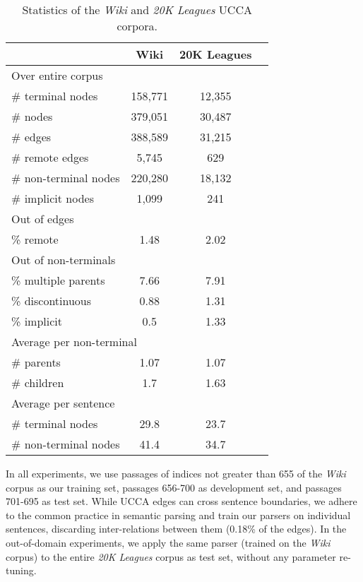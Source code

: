 \documentclass[11pt]{article}
\begin{document}
\begin{table}
\begin{tabular}{l|ccc}
& Wiki & 20K Leagues \\
\hline
\multicolumn{3}{l}{\footnotesize Over entire corpus} \\
\# terminal nodes & 158,771 & 12,355 \\
\# nodes & 379,051 & 30,487 \\
\# edges & 388,589 & 31,215 \\
\# remote edges & 5,745 & 629 \\
\# non-terminal nodes & 220,280 & 18,132 \\
\# implicit nodes & 1,099 & 241 \\
\multicolumn{3}{l}{\footnotesize Out of edges} \\
\% remote & 1.48 & 2.02 \\
\multicolumn{3}{l}{\footnotesize Out of non-terminals} \\
\% multiple parents & 7.66 & 7.91 \\
\% discontinuous & 0.88 & 1.31 \\
\% implicit & 0.5 & 1.33 \\
\multicolumn{3}{l}{\footnotesize Average per non-terminal} \\
\# parents & 1.07 & 1.07 \\
\# children & 1.7 & 1.63 \\
\multicolumn{3}{l}{\footnotesize Average per sentence} \\
\# terminal nodes & 29.8 & 23.7 \\
\# non-terminal nodes & 41.4 & 34.7 \\
\end{tabular}
\caption{Statistics of the \textit{Wiki} and \textit{20K Leagues} UCCA corpora.}
\label{table:data}
\end{table}

In all experiments, we use passages of indices not greater than 655
of the \textit{Wiki} corpus as our training set, passages 656-700 as development set,
and passages 701-695 as test set.
While UCCA edges can cross sentence boundaries, we adhere to the common
practice in semantic parsing and train our parsers on individual sentences,
discarding inter-relations between them (0.18\% of the edges).
In the out-of-domain experiments, we apply the same parser (trained on the \textit{Wiki}
corpus) to the entire \textit{20K Leagues} corpus as test set,
without any parameter re-tuning.
\end{document}
